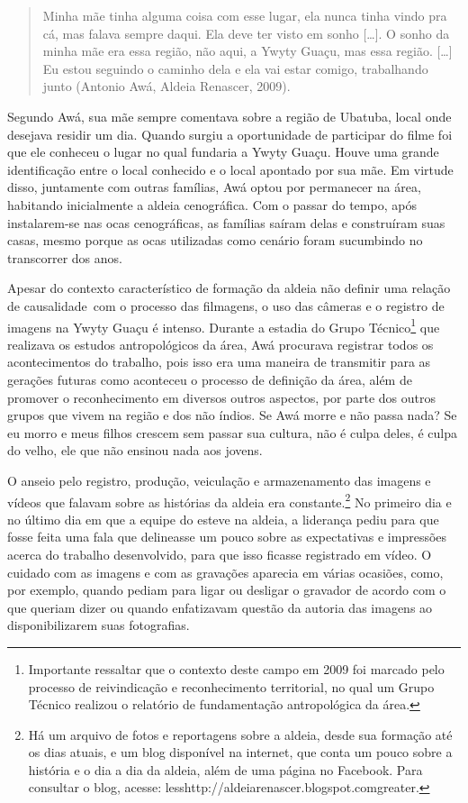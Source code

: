 \begin{quotation}
Minha mãe tinha alguma coisa com esse lugar, ela nunca tinha vindo pra
cá, mas falava sempre daqui. Ela deve ter visto em sonho [\ldots{}]. O sonho
da minha mãe era essa região, não aqui, a Ywyty Guaçu, mas essa região.
[\ldots{}] Eu estou seguindo o caminho dela e ela vai estar comigo,
trabalhando junto (Antonio Awá, Aldeia Renascer, 2009).
\end{quotation}

Segundo Awá, sua mãe sempre comentava sobre a região de Ubatuba, local
onde desejava residir um dia. Quando surgiu a oportunidade de
participar do filme foi que ele conheceu o lugar no qual fundaria a
Ywyty Guaçu. Houve uma grande identificação entre o local conhecido e o
local apontado por sua mãe. Em virtude disso, juntamente com outras
famílias, Awá optou por permanecer na área, habitando inicialmente a
aldeia cenográfica. Com o passar do tempo, após instalarem-se nas ocas
cenográficas, as famílias saíram delas e construíram suas casas, mesmo
porque as ocas utilizadas como cenário foram sucumbindo no transcorrer
dos anos. 

Apesar do contexto característico de formação da aldeia não definir uma
relação de causalidade~com o processo das filmagens, o uso das câmeras
e o registro de imagens na Ywyty Guaçu é intenso. Durante a estadia do
Grupo Técnico\footnote{Importante ressaltar que o contexto deste campo
em 2009 foi marcado pelo processo de reivindicação e reconhecimento
territorial, no qual um Grupo Técnico realizou o relatório de
fundamentação antropológica da área.} que realizava os estudos
antropológicos da área, Awá procurava registrar todos os acontecimentos
do trabalho, pois isso era uma maneira de transmitir para as gerações
futuras como aconteceu o processo de definição da área, além de
promover o reconhecimento em diversos outros aspectos, por parte dos
outros grupos que vivem na região e dos não índios. Se Awá morre e não
passa nada? Se eu morro e meus filhos crescem sem passar sua cultura,
não é culpa deles, é culpa do velho, ele que não ensinou nada aos
jovens. 

O anseio pelo registro, produção, veiculação e armazenamento das imagens
e vídeos que falavam sobre as histórias da aldeia era
constante.\footnote{Há um arquivo de fotos e reportagens sobre a
aldeia, desde sua formação até os dias atuais, e um blog disponível na
internet, que conta um pouco sobre a história e o dia a dia da aldeia,
além de uma página no Facebook. Para consultar o blog, acesse:
{less}http://aldeiarenascer.blogspot.com{greater}.} No
primeiro dia e no último dia em que a equipe do  esteve na aldeia, a
liderança pediu para que fosse feita uma fala que delineasse um pouco
sobre as expectativas e impressões acerca do trabalho desenvolvido,
para que isso ficasse registrado em vídeo. O cuidado com as imagens e
com as gravações aparecia em várias ocasiões, como, por exemplo, quando
pediam para ligar ou desligar o gravador de acordo com o que queriam
dizer ou quando enfatizavam questão da autoria das imagens ao
disponibilizarem suas fotografias.

